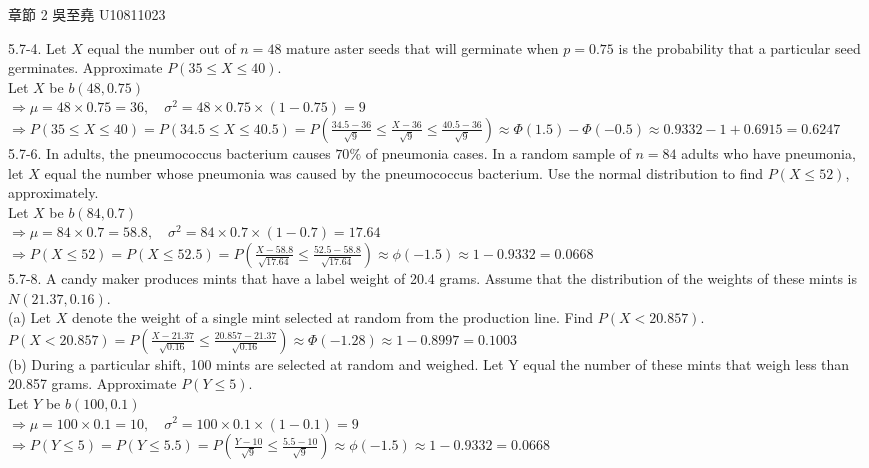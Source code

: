 \documentclass[12pt]{book}
\author{andersonwu2000}
\begin{document}
\begin{CJK}{UTF8}{bsmi}

\hfill 章節 2 吳至堯 U10811023

5.7-4. Let $X$ equal the number out of $n = 48$ mature
aster seeds that will germinate when $p = 0.75$ is the probability that a particular seed germinates. Approximate
$P(35 \le X \le 40)$. \\

Let $X$ be $b(48, 0.75)$ \\
$\Rightarrow \mu=48\times0.75=36,\quad\sigma^2=48\times0.75\times(1-0.75)=9$ \\
$\displaystyle\Rightarrow 
P(35 \le X \le 40)
=P(34.5 \le X \le 40.5)
=P(\frac{34.5-36}{\sqrt{9}}\le \frac{X-36}{\sqrt{9}} \le \frac{40.5-36}{\sqrt{9}})
\approx\Phi(1.5)-\Phi(-0.5)
\approx0.9332 - 1 + 0.6915
=0.6247$ \\

5.7-6. In adults, the pneumococcus bacterium causes $70\%$ of pneumonia cases. In a random sample of $n = 84$ adults who have pneumonia, let $X$ equal the number whose pneumonia was caused by the pneumococcus bacterium. Use the normal distribution to find $P(X \le 52)$, approximately. \\

Let $X$ be $b(84, 0.7)$ \\
$\Rightarrow \mu=84\times0.7=58.8,\quad\sigma^2=84\times0.7\times(1-0.7)=17.64$ \\
$\displaystyle\Rightarrow
P(X\le52)
=P(X\le52.5)
=P(\frac{X-58.8}{\sqrt{17.64}}\le\frac{52.5-58.8}{\sqrt{17.64}})
\approx\phi(-1.5)
\approx1-0.9332
=0.0668$ \\

5.7-8. A candy maker produces mints that have a label weight of 20.4 grams. Assume that the distribution of the weights of these mints is $N(21.37, 0.16)$. \\

(a) Let $X$ denote the weight of a single mint selected at random from the production line. Find $P(X < 20.857)$. \\
$\displaystyle P(X < 20.857)
=P(\frac{X-21.37}{\sqrt{0.16}} \le \frac{20.857-21.37}{\sqrt{0.16}})
\approx\Phi(-1.28)
\approx1-0.8997
=0.1003$ \\

(b) During a particular shift, 100 mints are selected at random and weighed. Let Y equal the number of these mints that weigh less than 20.857 grams. Approximate $P(Y \le 5)$. \\
Let $Y$ be $b(100, 0.1)$ \\
$\Rightarrow \mu=100\times0.1=10,\quad\sigma^2=100\times0.1\times(1-0.1)=9$ \\
$\displaystyle\Rightarrow
P(Y\le5)
=P(Y\le5.5)
=P(\frac{Y-10}{\sqrt{9}}\le\frac{5.5-10}{\sqrt{9}})
\approx\phi(-1.5)
\approx1-0.9332
=0.0668$ \\


\end{CJK}
\end{document}
